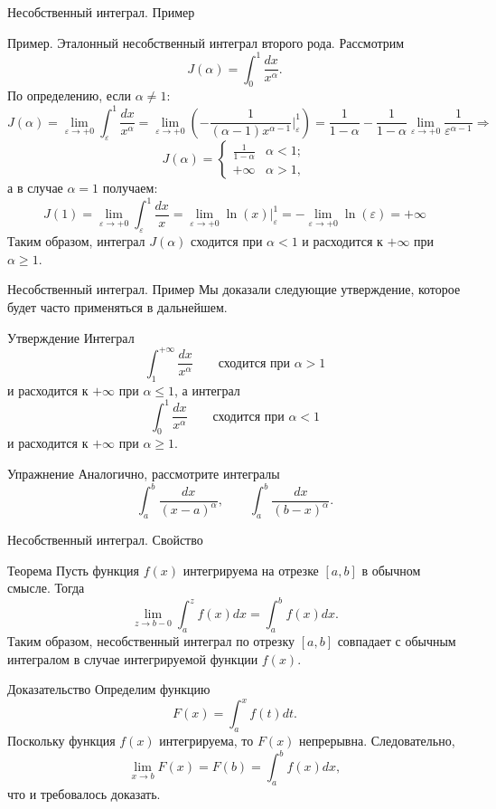 \documentclass[8pt]{beamer}
\begin{document}
\begin{frame}{Несобственный интеграл. Пример}
\begin{block}{Пример. Эталонный несобственный интеграл второго рода.}
Рассмотрим
$$J(\alpha)=\int_0^{1}\frac{dx}{x^\alpha}.$$
По определению, если $\alpha\ne1$:
$$J(\alpha) = \lim_{\varepsilon\to+0} \int_\varepsilon^1 \frac{dx}{x^\alpha} = 
\lim_{\varepsilon\to+0} \left(
 -\frac{1}{(\alpha-1)x^{\alpha-1}}\Big|_\varepsilon^1 \right) =
\frac{1}{1-\alpha} - \frac{1}{1-\alpha}\lim_{\varepsilon\to+0}\frac{1}{\varepsilon^{\alpha-1}}\Rightarrow$$
$$J(\alpha)=
\left\{ \begin{array}{ll}
\displaystyle \frac{1}{1-\alpha}& \alpha<1;\\
+\infty & \alpha>1,
\end{array}\right.$$
а в случае $\alpha=1$ получаем:
$$J(1) =  \lim_{\varepsilon\to+0} \int_\varepsilon^1 \frac{dx}{x} = 
\lim_{\varepsilon\to+0}\ln(x)\Big|_\varepsilon^1=- \lim_{\varepsilon\to+0}\ln(\varepsilon) = +\infty$$
Таким образом, интеграл $J(\alpha)$ сходится при $\alpha<1$ и расходится к $+\infty$ при $\alpha\ge1$.
\end{block}
\end{frame}

\begin{frame}{Несобственный интеграл. Пример}
Мы доказали следующие утверждение, которое будет часто применяться в дальнейшем.
\begin{block}{Утверждение}
Интеграл 
$$\int_1^{+\infty}\frac{dx}{x^\alpha}\qquad \text{сходится при $\alpha>1$}$$
и расходится к $+\infty$ при $\alpha\le1$, а интеграл $$\int_0^{1}\frac{dx}{x^\alpha}\qquad \text{сходится при $\alpha<1$}$$
и расходится к $+\infty$ при $\alpha\ge1$.
\end{block}
\begin{block}{Упражнение}
Аналогично, рассмотрите интегралы
$$\int_a^b\frac{dx}{(x-a)^\alpha},\qquad \int_a^b\frac{dx}{(b-x)^\alpha}.$$
\end{block}
\end{frame}

\begin{frame}{Несобственный интеграл. Свойство}
\begin{block}{Теорема}
Пусть функция $f(x)$ интегрируема на отрезке $[a,b]$ в обычном смысле. Тогда 
$$\lim_{z\to b-0} \int_a^z f(x)dx = \int_a^b f(x) dx.$$
Таким образом, несобственный интеграл по отрезку $[a,b]$ совпадает с обычным интегралом в случае интегрируемой функции $f(x)$.
\end{block}
\begin{block}{Доказательство}
Определим функцию
$$F(x) = \int_a^x f(t)dt.$$
Поскольку функция $f(x)$ интегрируема, то $F(x)$ непрерывна. Следовательно,
$$\lim_{x\to b} F(x) = F(b) = \int_a^b f(x)dx,$$
что и требовалось доказать.
\end{block}
\end{frame}
\end{document}
